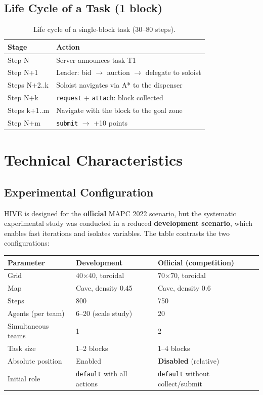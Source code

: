 \documentclass[11pt,a4paper]{article}
\newcommand{\code}[1]{\texttt{#1}}
\begin{document}
\subsection{Life Cycle of a Task (1 block)}
\begin{table}[H]
\centering
\begin{tabularx}{\linewidth}{l X}
\toprule
\textbf{Stage} & \textbf{Action} \\
\midrule
Step N & Server announces task T1 \\
Step N+1 & Leader: bid $\rightarrow$ auction $\rightarrow$ delegate to soloist \\
Steps N+2..k & Soloist navigates via A* to the dispenser \\
Step N+k & \code{request} + \code{attach}: block collected \\
Steps k+1..m & Navigate with the block to the goal zone \\
Step N+m & \code{submit} $\rightarrow$ +10 points \\
\bottomrule
\end{tabularx}
\caption{Life cycle of a single-block task (30--80 steps).}
\end{table}

\section{Technical Characteristics}

\subsection{Experimental Configuration}
HIVE is designed for the \textbf{official} MAPC 2022 scenario, but the systematic experimental study was conducted in a reduced \textbf{development scenario}, which enables fast iterations and isolates variables. The table contrasts the two configurations:

\begin{table}[H]
\centering
\begin{tabularx}{\linewidth}{X X X}
\toprule
\textbf{Parameter} & \textbf{Development} & \textbf{Official (competition)} \\
\midrule
Grid & 40$\times$40, toroidal & 70$\times$70, toroidal \\
Map & Cave, density 0.45 & Cave, density 0.6 \\
Steps & 800 & 750 \\
Agents (per team) & 6--20 (scale study) & 20 \\
Simultaneous teams & 1 & 2 \\
Task size & 1--2 blocks & 1--4 blocks \\
Absolute position & Enabled & \textbf{Disabled} (relative) \\
Initial role & \code{default} with all actions & \code{default} without collect/submit \\
\bottomrule
\end{tabularx}
\end{table}
\end{document}
